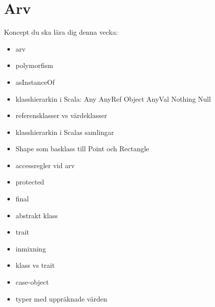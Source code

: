 \chapter{Arv}\label{chapter:W07}
Koncept du ska lära dig denna vecka:
\begin{multicols}{2}\begin{itemize}[nosep,label={$\square$},leftmargin=*]
\item arv
\item polymorfism
\item asInstanceOf
\item klasshierarkin i Scala: Any AnyRef Object AnyVal Nothing Null
\item referensklasser vs värdeklasser
\item klasshierarkin i Scalas samlingar
\item Shape som basklass till Point och Rectangle
\item accessregler vid arv
\item protected
\item final
\item abstrakt klass
\item trait
\item inmixning
\item klass vs trait
\item case-object
\item typer med uppräknade värden\end{itemize}\end{multicols}
